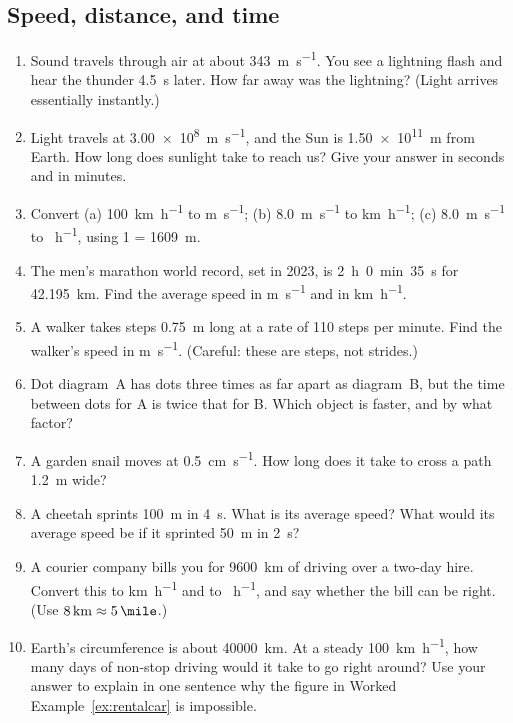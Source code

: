 \documentclass[11pt,twoside,openany]{book}
\begin{document}
\subsection*{Speed, distance, and time}
\begin{enumerate}[label=\textbf{\thechapter.\arabic*},resume=exercises,leftmargin=*]
  \item Sound travels through air at about \SI{343}{\metre\per\second}. You see a lightning flash and hear the thunder \SI{4.5}{\second} later. How far away was the lightning? (Light arrives essentially instantly.)
  \item Light travels at \SI{3.00e8}{\metre\per\second}, and the Sun is \SI{1.50e11}{\metre} from Earth. How long does sunlight take to reach us? Give your answer in seconds and in minutes.
  \item Convert (a) \SI{100}{\kilo\metre\per\hour} to \si{\metre\per\second}; (b) \SI{8.0}{\metre\per\second} to \si{\kilo\metre\per\hour}; (c) \SI{8.0}{\metre\per\second} to \si{\mile\per\hour}, using \SI{1}{\mile} = \SI{1609}{\metre}.
  \item The men's marathon world record, set in 2023, is \SI{2}{\hour}~\SI{0}{\minute}~\SI{35}{\second} for \SI{42.195}{\kilo\metre}. Find the average speed in \si{\metre\per\second} and in \si{\kilo\metre\per\hour}.
  \item A walker takes steps \SI{0.75}{\metre} long at a rate of \num{110} steps per minute. Find the walker's speed in \si{\metre\per\second}. (Careful: these are steps, not strides.)
  \item Dot diagram~A has dots three times as far apart as diagram~B, but the time between dots for A is twice that for B. Which object is faster, and by what factor?
  \item A garden snail moves at \SI{0.5}{\centi\metre\per\second}. How long does it take to cross a path \SI{1.2}{\metre} wide?
  \item A cheetah sprints \SI{100}{\metre} in \SI{4}{\second}. What is its average speed? What would its average speed be if it sprinted \SI{50}{\metre} in \SI{2}{\second}?
  \item A courier company bills you for \SI{9600}{\kilo\metre} of driving over a two-day hire. Convert this to \si{\kilo\metre\per\hour} and to \si{\mile\per\hour}, and say whether the bill can be right. (Use $\SI{8}{\kilo\metre} \approx \SI{5}{\mile}$.)
  \item Earth's circumference is about \SI{40000}{\kilo\metre}. At a steady \SI{100}{\kilo\metre\per\hour}, how many days of non-stop driving would it take to go right around? Use your answer to explain in one sentence why the figure in Worked Example~\ref{ex:rentalcar} is impossible.

\end{enumerate}
\end{document}
